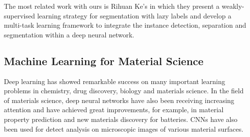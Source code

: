 \documentclass[10pt,twocolumn,letterpaper]{article}
\begin{document}
The most related work with ours is Rihuan Ke's\cite{ke2019multi} in which they present a weakly-supervised learning strategy for segmentation with lazy labels and develop a multi-task learning framework to integrate the instance detection, separation and segmentation within a deep neural network.

\subsection{Machine Learning for Material Science}
Deep learning has showed remarkable success on many important 
learning problems in chemistry\cite{goh2017deep}, 
drug discovery\cite{gawehn2016deep}\cite{chen2018rise}, 
biology\cite{webb2018deep} and materials science.
In the field of materials science, deep neural networks have also been receiving increasing attention and have achieved great improvements, for example, in material property prediction and new materials discovery for batteries\cite{pilania2013accelerating}\cite{hansen2015machine}\cite{ward2016general}\cite{liu2017materials}.
CNNs have also been used for detect analysis on microscopic images of various material surfaces\cite{lubbers2017inferring}\cite{li2018automated}\cite{nash2018review}.
\end{document}
